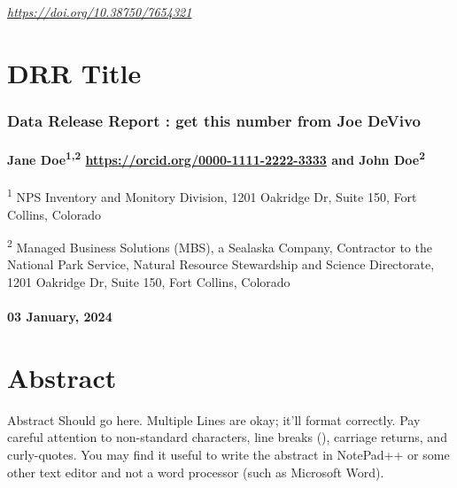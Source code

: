 \documentclass[
]{article}
\author{}
\date{\vspace{-2.5em}}
\begin{document}
\emph{\url{https://doi.org/10.38750/7654321}}

\hypertarget{drr-title}{%
\section{DRR Title}\label{drr-title}}

\hypertarget{data-release-report-get-this-number-from-joe-devivo}{%
\subsubsection{Data Release Report : get this number from Joe
DeVivo}\label{data-release-report-get-this-number-from-joe-devivo}}

\hypertarget{jane-doe12-httpsorcid.org0000-1111-2222-3333-and-john-doe2}{%
\paragraph{\texorpdfstring{Jane Doe\textsuperscript{1,2}
\url{https://orcid.org/0000-1111-2222-3333} and John
Doe\textsuperscript{2}}{Jane Doe1,2 https://orcid.org/0000-1111-2222-3333 and John Doe2}}\label{jane-doe12-httpsorcid.org0000-1111-2222-3333-and-john-doe2}}

\textsuperscript{1} NPS Inventory and Monitory Division, 1201 Oakridge
Dr, Suite 150, Fort Collins, Colorado

\textsuperscript{2} Managed Business Solutions (MBS), a Sealaska
Company, Contractor to the National Park Service, Natural Resource
Stewardship and Science Directorate, 1201 Oakridge Dr, Suite 150, Fort
Collins, Colorado

\hypertarget{january-2024}{%
\paragraph{\texorpdfstring{03 January, 2024
}{03 January, 2024 }}\label{january-2024}}

\hypertarget{abstract}{%
\section{Abstract}\label{abstract}}

Abstract Should go here. Multiple Lines are okay; it'll format
correctly. Pay careful attention to non-standard characters, line breaks
(), carriage returns, and curly-quotes. You may find it useful to write
the abstract in NotePad++ or some other text editor and not a word
processor (such as Microsoft Word).
\end{document}
